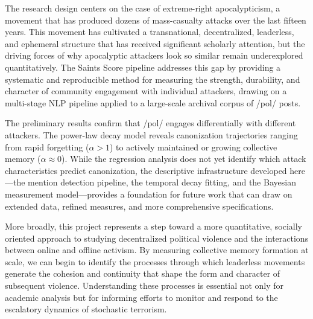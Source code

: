 \documentclass[12pt]{article}
\begin{document}
The research design centers on the case of extreme-right apocalypticism, a movement that has produced dozens of mass-casualty attacks over the last fifteen years. This movement has cultivated a transnational, decentralized, leaderless, and ephemeral structure that has received significant scholarly attention, but the driving forces of why apocalyptic attackers look so similar remain underexplored quantitatively. The Saints Score pipeline addresses this gap by providing a systematic and reproducible method for measuring the strength, durability, and character of community engagement with individual attackers, drawing on a multi-stage NLP pipeline applied to a large-scale archival corpus of /pol/ posts.

The preliminary results confirm that /pol/ engages differentially with different attackers. The power-law decay model reveals canonization trajectories ranging from rapid forgetting ($\alpha > 1$) to actively maintained or growing collective memory ($\alpha \approx 0$). While the regression analysis does not yet identify which attack characteristics predict canonization, the descriptive infrastructure developed here---the mention detection pipeline, the temporal decay fitting, and the Bayesian measurement model---provides a foundation for future work that can draw on extended data, refined measures, and more comprehensive specifications.

More broadly, this project represents a step toward a more quantitative, socially oriented approach to studying decentralized political violence and the interactions between online and offline activism. By measuring collective memory formation at scale, we can begin to identify the processes through which leaderless movements generate the cohesion and continuity that shape the form and character of subsequent violence. Understanding these processes is essential not only for academic analysis but for informing efforts to monitor and respond to the escalatory dynamics of stochastic terrorism.

\printbibliography
\end{document}

